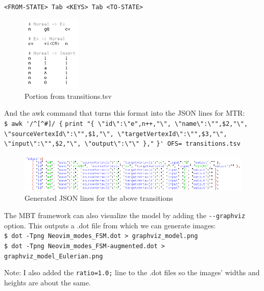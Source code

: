 \documentclass[12pt]{article}
\begin{document}
		\verb|<FROM-STATE> Tab <KEYS> Tab <TO-STATE>|\\

		\begin{figure}[h]
			\centering
			\includegraphics[width=0.25\textwidth]{images/transitions_tsv.png}
			\caption{Portion from transitions.tsv}
		\end{figure}

		And the awk command that turns this format into the JSON lines for MTR:\\

		{\parindent0pt
		\verb|$ awk '/^[^#]/ {|
		\verb|print "{ \"id\":\"e",n++,"\", \"name\":\"",$2,"\", |\\
		\verb|\"sourceVertexId\":\"",$1,"\", \"targetVertexId\":\"",$3,"\",|\\
		\verb|\"input\":\"",$2,"\", \"output\":\"\" },"|
		\verb|}' OFS= transitions.tsv|\\
		}

		\begin{figure}[h]
			\centering
			\includegraphics[width=1.0\textwidth]{images/transitions_json_lines_snippet.png}
			\caption{Generated JSON lines for the above transitions}
		\end{figure}

		The MBT framework can also visualize the model by adding the \verb|--graphviz| \cite{graphviz} option. This outputs a .dot file from which we can generate images:\\

		{\parindent0pt
		\verb|$ dot -Tpng Neovim_modes_FSM.dot > graphviz_model.png|\\
		\verb|$ dot -Tpng Neovim_modes_FSM-augmented.dot > graphviz_model_Eulerian.png|\\
		}

		Note: I also added the \verb|ratio=1.0;| line to the .dot files so the images' widths and heights are about the same.
\end{document}
